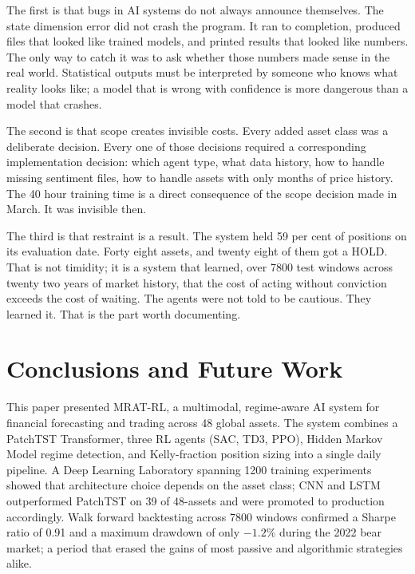 \documentclass[journal]{IEEEtran}
\begin{document}
The first is that bugs in AI systems do not always announce themselves.
The state dimension error did not crash the program. It ran to completion,
produced files that looked like trained models, and printed results that
looked like numbers. The only way to catch it was to ask whether those
numbers made sense in the real world. Statistical outputs must be
interpreted by someone who knows what reality looks like; a model that
is wrong with confidence is more dangerous than a model that crashes.

The second is that scope creates invisible costs. Every added asset class
was a deliberate decision. Every one of those decisions required a
corresponding implementation decision: which agent type, what data
history, how to handle missing sentiment files, how to handle assets with
only months of price history. The 40 hour training time is a direct
consequence of the scope decision made in March. It was invisible then.

The third is that restraint is a result. The system held 59 per cent of
positions on its evaluation date. Forty eight assets, and twenty eight
of them got a HOLD. That is not timidity; it is a system that learned,
over 7800 test windows across twenty two years of market history, that
the cost of acting without conviction exceeds the cost of waiting. The
agents were not told to be cautious. They learned it. That is the part
worth documenting.

\section{Conclusions and Future Work}
\label{sec:conclusion}

This paper presented MRAT-RL, a multimodal, regime-aware AI system for
financial forecasting and trading across 48 global assets. The system
combines a PatchTST Transformer, three RL agents (SAC, TD3, PPO), Hidden
Markov Model regime detection, and Kelly-fraction position sizing into a
single daily pipeline. A Deep Learning Laboratory spanning 1200 training
experiments showed that architecture choice depends on the asset class;
CNN and LSTM outperformed PatchTST on 39 of 48-assets and were promoted
to production accordingly. Walk forward backtesting across 7800 windows
confirmed a Sharpe ratio of 0.91 and a maximum drawdown of only $-1.2\%$
during the 2022 bear market; a period that erased the gains of most
passive and algorithmic strategies alike.
\end{document}
